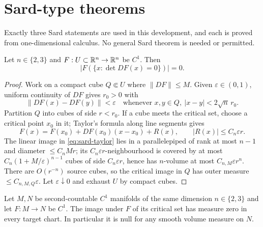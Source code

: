 \chapter{Sard-type theorems}\label{ch:sard}

Exactly three Sard statements are used in this development, and each is proved
from one-dimensional calculus.  No general Sard theorem is needed or
permitted.

\begin{lemma}\label{lem:sard-equidim}
Let $n\in\{2,3\}$ and $F:U\subset\mathbb R^n\to\mathbb R^n$ be $C^1$.  Then
\[
  \bigl|F(\{x:\det DF(x)=0\})\bigr|=0 .
\]
\end{lemma}

\begin{proof}
Work on a compact cube $Q\Subset U$ where $\|DF\|\le M$.  Given
$\varepsilon\in(0,1)$, uniform continuity of $DF$ gives $r_0>0$ with
\begin{equation}\label{eq:sard-unif}
  \|DF(x)-DF(y)\|<\varepsilon
  \quad\text{whenever }x,y\in Q,\ |x-y|<2\sqrt n\,r_0 .
\end{equation}
Partition $Q$ into cubes of side $r<r_0$.  If a cube meets the critical set,
choose a critical point $x_0$ in it; Taylor's formula along line segments
gives
\begin{equation}\label{eq:sard-taylor}
  F(x)=F(x_0)+DF(x_0)(x-x_0)+R(x),\qquad|R(x)|\le C_n\varepsilon r .
\end{equation}
The linear image in \eqref{eq:sard-taylor} lies in a parallelepiped of rank at
most $n-1$ and diameter $\le C_nMr$; its $C_n\varepsilon r$-neighbourhood is
covered by at most $C_n(1+M/\varepsilon)^{n-1}$ cubes of side
$C_n\varepsilon r$, hence has $n$-volume at most $C_{n,M}\varepsilon r^n$.
There are $O(r^{-n})$ source cubes, so the critical image in $Q$ has outer
measure $\le C_{n,M,Q}\varepsilon$.  Let $\varepsilon\downarrow0$ and exhaust
$U$ by compact cubes.
\end{proof}

\begin{corollary}\label{cor:sard-charts}
Let $M,N$ be second-countable $C^1$ manifolds of the same dimension
$n\in\{2,3\}$ and let $F:M\to N$ be $C^1$.  The image under $F$ of its
critical set has measure zero in every target chart.  In particular it is
null for any smooth volume measure on $N$.
\end{corollary}

